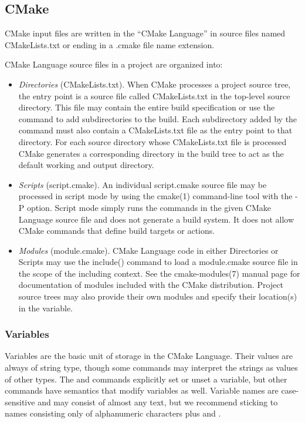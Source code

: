 \subsection{CMake}
CMake input files are written in the “CMake Language” in source files named CMakeLists.txt or ending in a .cmake file name extension.

CMake Language source files in a project are organized into:
\begin{itemize}
    \item \emph{Directories} (CMakeLists.txt). When CMake processes a project source tree, the entry point is a source file called CMakeLists.txt in the top-level source directory. This file may contain the entire build specification or use the  command to add subdirectories to the build. Each subdirectory added by the command must also contain a CMakeLists.txt file as the entry point to that directory. For each source directory whose CMakeLists.txt file is processed CMake generates a corresponding directory in the build tree to act as the default working and output directory.
    \item \emph{Scripts} (script.cmake). An individual script.cmake source file may be processed in script mode by using the cmake(1) command-line tool with the -P option. Script mode simply runs the commands in the given CMake Language source file and does not generate a build system. It does not allow CMake commands that define build targets or actions.
    \item \emph{Modules} (module.cmake). CMake Language code in either Directories or Scripts may use the include() command to load a module.cmake source file in the scope of the including context. See the cmake-modules(7) manual page for documentation of modules included with the CMake distribution. Project source trees may also provide their own modules and specify their location(s) in the  variable.
\end{itemize}

\subsubsection{Variables}
Variables are the basic unit of storage in the CMake Language. Their values are always of string type, though some commands may interpret the strings as values of other types. The  and  commands explicitly set or unset a variable, but other commands have semantics that modify variables as well. Variable names are case-sensitive and may consist of almost any text, but we recommend sticking to names consisting only of alphanumeric characters plus \inlinecode{_} and \inlinecode{-}.

